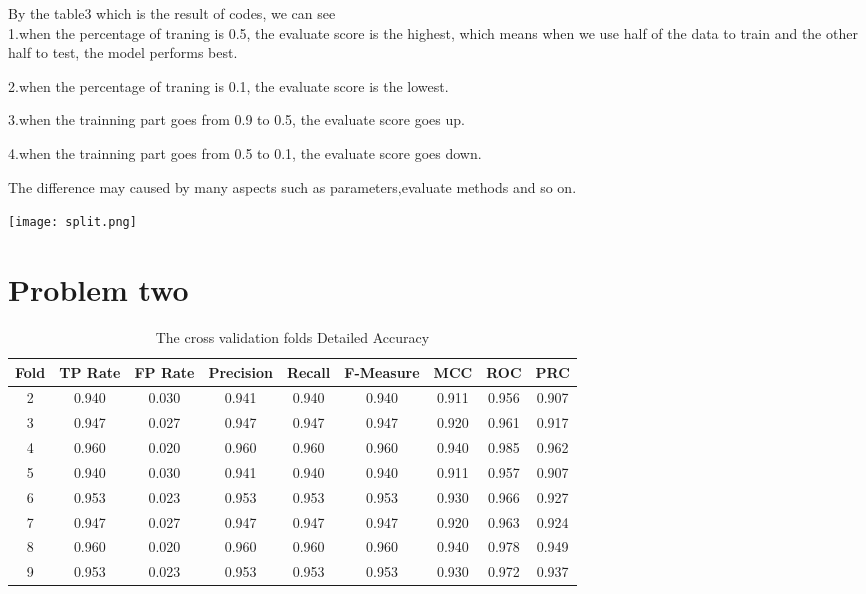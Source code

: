 \documentclass[a4pper,11pt,onecolumn]{article}
\begin{document}
By the table3 which is the result of codes, we can see\\

1.when the percentage of traning is 0.5, the evaluate score is the highest, which means when we use half of the data to train and the other half to test, the model performs best.

2.when the percentage of traning is 0.1, the evaluate score is the lowest.

3.when the trainning part goes from 0.9 to 0.5, the evaluate score goes up.

4.when the trainning part goes from 0.5 to 0.1, the evaluate score goes down.

The difference may caused by many aspects such as parameters,evaluate methods and so on.

\texttt{[image: split.png]}


\section{Problem two}

\begin{table}[h] 
	\centering  
	\caption{The cross validation folds Detailed Accuracy }  %
	\begin{tabular}{ccccccccc}  
		\hline
		\hline
		Fold & TP Rate & FP Rate & Precision & Recall & F-Measure & MCC   & ROC   & PRC   \\ [0.5ex] 
		\hline
	2    & 0.940   & 0.030   & 0.941     & 0.940  & 0.940     & 0.911 & 0.956 & 0.907 \\
	3    & 0.947   & 0.027   & 0.947     & 0.947  & 0.947     & 0.920 & 0.961 & 0.917 \\
	4    & 0.960   & 0.020   & 0.960     & 0.960  & 0.960     & 0.940 & 0.985 & 0.962 \\
	5    & 0.940   & 0.030   & 0.941     & 0.940  & 0.940     & 0.911 & 0.957 & 0.907 \\
	6    & 0.953   & 0.023   & 0.953     & 0.953  & 0.953     & 0.930 & 0.966 & 0.927 \\
	7    & 0.947   & 0.027   & 0.947     & 0.947  & 0.947     & 0.920 & 0.963 & 0.924 \\
	8    & 0.960   & 0.020   & 0.960     & 0.960  & 0.960     & 0.940 & 0.978 & 0.949 \\
	9    & 0.953   & 0.023   & 0.953     & 0.953  & 0.953     & 0.930 & 0.972 & 0.937\\
		\hline
		\hline
	\end{tabular}
\end{table}
\end{document}
